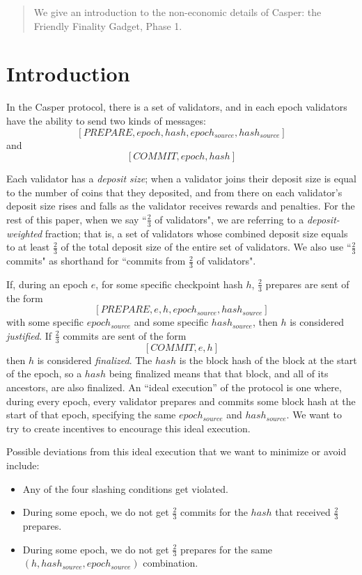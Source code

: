 \documentclass[12pt]{article}
\begin{document}
\maketitle
\begin{abstract}
We give an introduction to the non-economic details of Casper: the Friendly Finality Gadget, Phase 1.
\end{abstract}

\section{Introduction}
In the Casper protocol, there is a set of validators, and in each epoch validators have the ability to send two kinds of messages: $$[PREPARE, epoch, hash, epoch_{source}, hash_{source}]$$ and $$[COMMIT, epoch, hash]$$

Each validator has a \textit{deposit size}; when a validator joins their deposit size is equal to the number of coins that they deposited, and from there on each validator's deposit size rises and falls as the validator receives rewards and penalties. For the rest of this paper, when we say ``$\frac{2}{3}$ of validators", we are referring to a \textit{deposit-weighted} fraction; that is, a set of validators whose combined deposit size equals to at least $\frac{2}{3}$ of the total deposit size of the entire set of validators. We also use ``$\frac{2}{3}$ commits" as shorthand for ``commits from $\frac{2}{3}$ of validators".

If, during an epoch $e$, for some specific checkpoint hash $h$, $\frac{2}{3}$ prepares are sent of the form $$[PREPARE, e, h, epoch_{source}, hash_{source}]$$ with some specific $epoch_{source}$ and some specific $hash_{source}$, then $h$ is considered \textit{justified}. If $\frac{2}{3}$ commits are sent of the form $$[COMMIT, e, h]$$ then $h$ is considered \textit{finalized}. The $hash$ is the block hash of the block at the start of the epoch, so a $hash$ being finalized means that that block, and all of its ancestors, are also finalized. An ``ideal execution'' of the protocol is one where, during every epoch, every validator prepares and commits some block hash at the start of that epoch, specifying the same $epoch_{source}$ and $hash_{source}$. We want to try to create incentives to encourage this ideal execution.

Possible deviations from this ideal execution that we want to minimize or avoid include:

\begin{itemize}
\item Any of the four slashing conditions get violated.
\item During some epoch, we do not get $\frac{2}{3}$ commits for the $hash$ that received $\frac{2}{3}$ prepares.
\item During some epoch, we do not get $\frac{2}{3}$ prepares for the same \\ $(h, hash_{source}, epoch_{source})$ combination.
\end{itemize}
\end{document}
